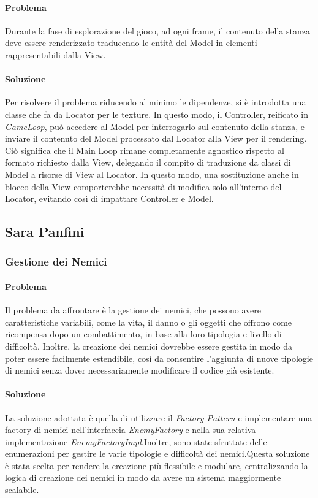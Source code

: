 \documentclass[a4paper,12pt]{report}
\begin{document}
\paragraph{Problema} Durante la fase di esplorazione del gioco, ad ogni frame, il contenuto della stanza deve essere renderizzato traducendo le entità del Model in elementi rappresentabili dalla View.
\paragraph{Soluzione} Per risolvere il problema riducendo al minimo le dipendenze, si è introdotta una classe che fa da Locator per le texture. In questo modo, il Controller, reificato in \textit{GameLoop}, può accedere al Model per interrogarlo sul contenuto della stanza, e inviare il contenuto del Model processato dal Locator alla View per il rendering. Ciò significa che il Main Loop rimane completamente agnostico rispetto al formato richiesto dalla View, delegando il compito di traduzione da classi di Model a risorse di View al Locator. In questo modo, una sostituzione anche in blocco della View comporterebbe necessità di modifica solo all'interno del Locator, evitando così di impattare Controller e Model.

\subsection{Sara Panfini}

\subsubsection{Gestione dei Nemici}

\paragraph{Problema} Il problema da affrontare è la gestione dei nemici, che possono avere caratteristiche variabili, come
la vita, il danno o gli oggetti che offrono come ricompensa dopo un combattimento, in base alla loro tipologia e livello di difficoltà.
Inoltre, la creazione dei nemici dovrebbe essere gestita in modo da poter essere facilmente estendibile, così da consentire l'aggiunta
di nuove tipologie di nemici senza dover necessariamente modificare il codice già esistente.
\paragraph{Soluzione} La soluzione adottata è quella di utilizzare il \textit{Factory Pattern} e implementare una factory di nemici nell'interfaccia
\textit{EnemyFactory} e nella sua relativa implementazione \textit{EnemyFactoryImpl}.\newline Inoltre, sono state sfruttate delle enumerazioni per
gestire le varie tipologie e difficoltà dei nemici.\newline Questa soluzione è stata scelta per rendere la creazione più flessibile e modulare, centralizzando
la logica di creazione dei nemici in modo da avere un sistema maggiormente scalabile.\newline
\end{document}
